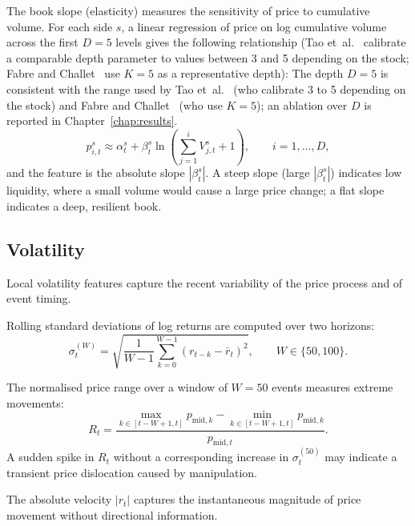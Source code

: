\documentclass[11pt]{report}
\begin{document}
The book slope (elasticity) measures the sensitivity of price to cumulative volume. For each side $s$, a linear regression of price on log cumulative volume across the first $D = 5$ levels gives the following relationship (Tao et~al.~\cite{tao_2020} calibrate a comparable depth parameter to values between 3 and 5 depending on the stock; Fabre and Challet~\cite{fabre_2025} use $K = 5$ as a representative depth): The depth $D = 5$ is consistent with the range used by Tao et~al.~\cite{tao_2020} (who calibrate 3 to 5 depending on the stock) and Fabre and Challet~\cite{fabre_2025} (who use $K = 5$); an ablation over $D$ is reported in Chapter~\ref{chap:results}.
\begin{equation}
  \label{eq:book_slope}
  p^s_{i,t} \approx \alpha^s_t + \beta^s_t \ln\!\left(\sum_{j=1}^{i} V^s_{j,t} + 1\right), \qquad i = 1, \ldots, D,
\end{equation}
and the feature is the absolute slope $|\beta^s_t|$. A steep slope (large $|\beta^s_t|$) indicates low liquidity, where a small volume would cause a large price change; a flat slope indicates a deep, resilient book.


\subsection{Volatility}\label{subsec:features:volatility}

Local volatility features capture the recent variability of the price process and of event timing.

Rolling standard deviations of log returns are computed over two horizons:
\begin{equation}
  \label{eq:rolling_vol}
  \sigma^{(W)}_t = \sqrt{\frac{1}{W-1}\sum_{k=0}^{W-1}(r_{t-k} - \bar{r}_t)^2}, \qquad W \in \{50, 100\}.
\end{equation}

The normalised price range over a window of $W = 50$ events measures extreme movements:
\begin{equation}
  \label{eq:price_range}
  R_t = \frac{\max_{k \in [t-W+1, t]} p_{\text{mid},k} - \min_{k \in [t-W+1, t]} p_{\text{mid},k}}{p_{\text{mid},t}}.
\end{equation}
A sudden spike in $R_t$ without a corresponding increase in $\sigma^{(50)}_t$ may indicate a transient price dislocation caused by manipulation.

The absolute velocity $|r_t|$ captures the instantaneous magnitude of price movement without directional information.
\end{document}
